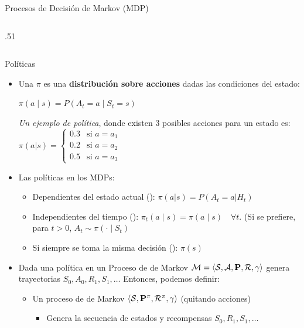 \documentclass[10pt, envcountsect, handout, aspectratio=1610, hyperref={hypertexnames=true}]{beamer}
\begin{document}
\begin{frame}{Procesos de Decisión de Markov (MDP)}
\begin{columns}
\begin{column}{.51\textwidth}
\end{column}
\end{columns}

\end{frame}




\begin{frame}{Políticas}
\begin{itemize}
    \item Una  \( \pi \) es una \textbf{distribución sobre acciones} dadas las condiciones del estado:\\
    \centerline{ \(    \pi(a \mid s) = P(A_t = a \mid S_t = s)     \) }
    
    
    
    \textit{Un ejemplo de política}, donde existen 3 posibles acciones para un estado es:
    $
    \pi(a|s) = \begin{cases}
        0.3 & \text{si } a = a_1 \\
        0.2 & \text{si } a = a_2 \\
        0.5 & \text{si } a = a_3
        \end{cases}
        $

    \item Las políticas en los MDPs:
    \begin{itemize}
        \item Dependientes del estado actual (): $\pi(a|s)=P(A_t=a|H_t)$
        \item Independientes del tiempo (): $\pi_t(a \mid s) = \pi(a \mid s) \quad \forall t. $ (Si se prefiere, para \( t > 0 \), \( A_t \sim \pi(\cdot \mid S_t) \)
        \item Si siempre se toma la misma decisión (): $\pi(s)$
    \end{itemize}
    
    \item Dada una política en un Proceso de  de Markov $\mathcal{M} = \langle \mathcal{S}, \mathcal{A}, \mathbf{P}, \mathcal{R}, \gamma \rangle$ genera trayectorias $S_0, A_0, R_1, S_1, \ldots $
	Entonces, podemos definir:
    \begin{itemize}
    			
        \item Un proceso de  de Markov $\langle \mathcal{S}, \mathbf{P}^\pi, \mathcal{R}^\pi, \gamma \rangle$ (quitando acciones)
        	\begin{itemize}
			\item Genera la secuencia de estados y recompensas $S_0, R_1, S_1, \ldots$ 
			\end{itemize}
			

\end{itemize}
\end{itemize}
\end{frame}
\end{document}

